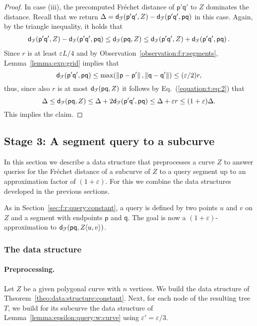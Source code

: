 \documentclass[12pt]{article}
\newcommand{\seclab}[1]{\label{sec:#1}}
\newcommand{\secref}[1]{Section~\ref{sec:#1}}
\newcommand{\thmref}[1]{Theorem~\ref{theo:#1}}
\newcommand{\lemref}[1]{Lemma~\ref{lemma:#1}}
\newcommand{\Eqref}[1]{Eq.~(\ref{equation:#1})}
\newcommand{\obsref}[1]{Observation~\ref{observation:#1}}
\newcommand{\ts}{\hspace{0.6pt}}
\newcommand{\Frechet}{Fr\'{e}c{h}e{}t\xspace}\providecommand{\Arr}{\mathop{\mathrm{\EuScript{A}}}}
\newcommand{\distFr}[2]{\mathsf{d}_{\EuScript{F}}\pth{#1, #2}}
\newcommand{\distX}[2]{\distCmd{#1 - #2}}
\newcommand{\pnt}{\mathsf{p}}
\newcommand{\pntA}{\mathsf{q}}
\newcommand{\cZ}{{Z}}
\providecommand{\pth}[2][\!]{#1\left({#2}\right)}
\providecommand{\eps}{{\varepsilon}}\renewcommand{\Re}{{\rm I\!\hspace{-0.025em} R}}
\newcommand{\SC}[3]{{#1}\!\!\ts\ts \left\langle  #2, #3 \right\rangle}
\newcommand{\Tree}{T}
\numberwithin{figure}{section}
\numberwithin{equation}{section}
\newcommand{\Eqlab}[1]{\label{equation:#1}}
\newcommand{\gridMin}{\ensuremath{\eps L/4}}
\begin{document}
\begin{proof}
    In case (iii), the precomputed \Frechet distance of $\pnt'\pntA'$ to
    $\cZ$ dominates the distance. Recall that we return 
    $\Delta = \distFr{\pnt'\pntA'}{\cZ} - \distFr{\pnt'\pntA'}{\pnt\pntA}$  in
    this case.
    Again, by the triangle inequality, it holds
    that
    \begin{align}\Eqlab{t:eq:2}
         \distFr{\pnt'\pntA'}{\cZ} - \distFr{\pnt'\pntA'}{\pnt\pntA} 
    \leq \distFr{\pnt\pntA}{\cZ} 
    \leq \distFr{\pnt'\pntA'}{\cZ} + \distFr{\pnt'\pntA'}{\pnt\pntA}.
    \end{align}
    Since $r$ is at least $\gridMin$ and by \obsref{f:r:segments}, \lemref{exp:grid} implies that 
    \[\distFr{\pnt'\pntA'}{\pnt\pntA}\leq
    \max\pth{\distX{\pnt}{\pnt'},\distX{\pntA}{\pntA'}} \leq (\eps/2) r,\]
    thus, since also $r$ is at most $\distFr{\pnt\pntA}{\cZ}$ it follows by \Eqref{t:eq:2} that 
    \[
    \Delta 
    \leq \distFr{\pnt\pntA}{\cZ} 
    \leq  \Delta + 2 \distFr{\pnt'\pntA'}{\pnt\pntA} 
    \leq \Delta + \eps r \leq (1+\eps)\Delta.
    \]
    This implies the claim.
\end{proof}











\subsection{Stage 3: A segment query to a subcurve}
\seclab{queries:prelim}\seclab{queries:stage:three}\seclab{f:r:query}

In this section we describe a data structure that preprocesses a curve
$\cZ$ to answer queries for the \Frechet distance of a subcurve of
$\cZ$ to a query segment up to an approximation factor of
$(1+\eps)$. For this we combine the data structures developed in the
previous sections.

As in \secref{f:r:query:constant}, a query is defined by two points
$u$ and $v$ on $\cZ$ and a segment with endpoints $\pnt$ and
$\pntA$. The goal is now a $(1+\eps)$-approximation to $\distFr{\pnt
   \pntA}{\SC{\cZ}{u}{v}}$.

\subsubsection{The data structure}

\paragraph{Preprocessing.}
Let $\cZ$ be a given polygonal curve with $n$ vertices. We build the
data structure of \thmref{data:structure:constant}. Next, for each
node of the resulting tree $\Tree$, we build for its subcurve the data
structure of \lemref{epsilon:query:w:curve} using $\eps'=\eps/3$.
\end{document}
